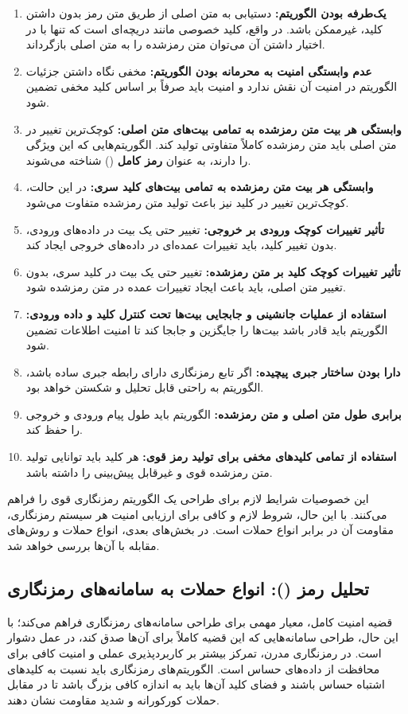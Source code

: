 \begin{enumerate}
    \item \textbf{یک‌طرفه بودن الگوریتم:} دستیابی به متن اصلی از طریق متن رمز بدون داشتن کلید، غیرممکن باشد. در واقع، کلید خصوصی مانند دریچه‌ای است که تنها با در اختیار داشتن آن می‌توان متن رمزشده را به متن اصلی بازگرداند.
    \item \textbf{عدم وابستگی امنیت به محرمانه بودن الگوریتم:} مخفی نگاه داشتن جزئیات الگوریتم در امنیت آن نقش ندارد و امنیت باید صرفاً بر اساس کلید مخفی تضمین شود.
    \item \textbf{وابستگی هر بیت متن رمزشده به تمامی بیت‌های متن اصلی:} کوچک‌ترین تغییر در متن اصلی باید متن رمزشده کاملاً متفاوتی تولید کند. الگوریتم‌هایی که این ویژگی را دارند، به عنوان \textbf{رمز کامل} () شناخته می‌شوند.
    \item \textbf{وابستگی هر بیت متن رمزشده به تمامی بیت‌های کلید سری:} در این حالت، کوچک‌ترین تغییر در کلید نیز باعث تولید متن رمزشده متفاوت می‌شود.
    \item \textbf{تأثیر تغییرات کوچک ورودی بر خروجی:} تغییر حتی یک بیت در داده‌های ورودی، بدون تغییر کلید، باید تغییرات عمده‌ای در داده‌های خروجی ایجاد کند.
    \item \textbf{تأثیر تغییرات کوچک کلید بر متن رمزشده:} تغییر حتی یک بیت در کلید سری، بدون تغییر متن اصلی، باید باعث ایجاد تغییرات عمده در متن رمزشده شود.
    \item \textbf{استفاده از عملیات جانشینی و جابجایی بیت‌ها تحت کنترل کلید و داده ورودی:} الگوریتم باید قادر باشد بیت‌ها را جایگزین و جابجا کند تا امنیت اطلاعات تضمین شود.
    \item \textbf{دارا بودن ساختار جبری پیچیده:} اگر تابع رمزنگاری دارای رابطه جبری ساده باشد، الگوریتم به راحتی قابل تحلیل و شکستن خواهد بود.
    \item \textbf{برابری طول متن اصلی و متن رمزشده:} الگوریتم باید طول پیام ورودی و خروجی را حفظ کند.
    \item \textbf{استفاده از تمامی کلیدهای مخفی برای تولید رمز قوی:} هر کلید باید توانایی تولید متن رمزشده قوی و غیرقابل پیش‌بینی را داشته باشد.
\end{enumerate}

این خصوصیات شرایط لازم برای طراحی یک الگوریتم رمزنگاری قوی را فراهم می‌کنند. با این حال، شروط لازم و کافی برای ارزیابی امنیت هر سیستم رمزنگاری، مقاومت آن در برابر انواع حملات است. در بخش‌های بعدی، انواع حملات و روش‌های مقابله با آن‌ها بررسی خواهد شد.

\subsection{تحلیل رمز (): انواع حملات به سامانه‌های رمزنگاری}
قضیه امنیت کامل، معیار مهمی برای طراحی سامانه‌های رمزنگاری فراهم می‌کند؛ با این حال، طراحی سامانه‌هایی که این قضیه کاملاً برای آن‌ها صدق کند، در عمل دشوار است. در رمزنگاری مدرن، تمرکز بیشتر بر کاربردپذیری عملی و امنیت کافی برای محافظت از داده‌های حساس است. الگوریتم‌های رمزنگاری باید نسبت به کلیدهای اشتباه حساس باشند و فضای کلید آن‌ها باید به اندازه کافی بزرگ باشد تا در مقابل حملات کورکورانه و شدید مقاومت نشان دهند\cite{ref34}.

